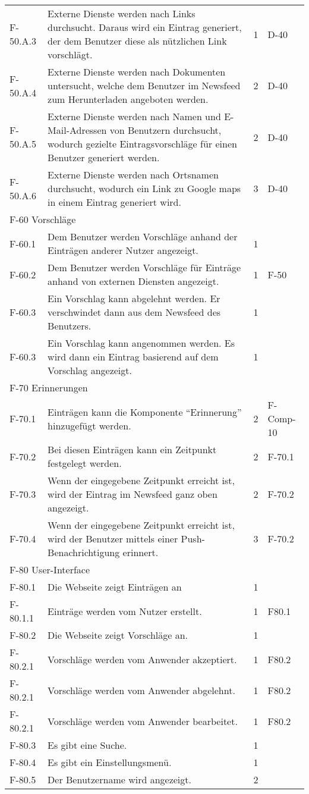 \begin{tabularx}{\textwidth}{|l|X|l|l|}
    F-50.A.3 & Externe Dienste werden nach Links durchsucht. Daraus wird ein Eintrag generiert, der dem Benutzer diese als nützlichen Link vorschlägt. & 1 & D-40\\
    F-50.A.4 & Externe Dienste werden nach Dokumenten untersucht, welche dem Benutzer im Newsfeed zum Herunterladen angeboten werden. & 2 & D-40\\
    F-50.A.5 & Externe Dienste werden nach Namen und E-Mail-Adressen von Benutzern durchsucht, wodurch gezielte Eintragsvorschläge für einen Benutzer generiert werden. & 2 & D-40\\
    F-50.A.6 & Externe Dienste werden nach Ortsnamen durchsucht, wodurch ein Link zu Google maps in einem Eintrag generiert wird. & 3 & D-40\\
    \hline
    \multicolumn{4}{|l|}{F-60 Vorschläge}\\
    \hline 
    F-60.1 & Dem Benutzer werden Vorschläge anhand der Einträgen anderer Nutzer angezeigt. & 1 & \\
    F-60.2 & Dem Benutzer werden Vorschläge für Einträge anhand von externen Diensten angezeigt. & 1 & F-50 \\
    F-60.3 & Ein Vorschlag kann abgelehnt werden. Er verschwindet dann aus dem Newsfeed des Benutzers. & 1 & \\
    F-60.3 & Ein Vorschlag kann angenommen werden. Es wird dann ein Eintrag basierend auf dem Vorschlag angezeigt. & 1 & \\
    \hline
    \multicolumn{4}{|l|}{F-70 Erinnerungen}\\
    \hline
    F-70.1 & Einträgen kann die Komponente \enquote{Erinnerung} hinzugefügt werden. & 2 & F-Comp-10 \\
    F-70.2 & Bei diesen Einträgen kann ein Zeitpunkt festgelegt werden. & 2 & F-70.1 \\
    F-70.3 & Wenn der eingegebene Zeitpunkt erreicht ist, wird der Eintrag im Newsfeed ganz oben angezeigt. & 2 & F-70.2 \\
    F-70.4 & Wenn der eingegebene Zeitpunkt erreicht ist, wird der Benutzer mittels einer Push-Benachrichtigung erinnert. & 3 & F-70.2 \\
    \hline
    \multicolumn{4}{|l|}{F-80 User-Interface}\\
    \hline
    F-80.1 & Die Webseite zeigt Einträgen an & 1 & \\
    F-80.1.1 & Einträge werden vom Nutzer erstellt. & 1 & F80.1\\
    F-80.2 & Die Webseite zeigt Vorschläge an. & 1 &  \\
    F-80.2.1 & Vorschläge werden vom Anwender akzeptiert. & 1 &  F80.2\\
    F-80.2.1 & Vorschläge werden vom Anwender abgelehnt. & 1 &  F80.2\\
    F-80.2.1 & Vorschläge werden vom Anwender bearbeitet. & 1 &  F80.2\\
    F-80.3 & Es gibt eine Suche. & 1 &  \\
    F-80.4 & Es gibt ein Einstellungsmenü. & 1 & \\
    F-80.5 & Der Benutzername wird angezeigt. & 2 & \\
    \hline


\end{tabularx}
